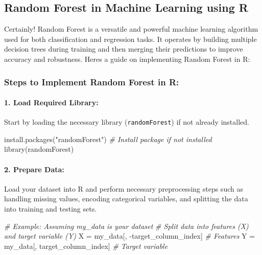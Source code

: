 \documentclass[
]{article}
\newenvironment{Shaded}{}{}
\newcommand{\CommentTok}[1]{\textcolor[rgb]{0.38,0.63,0.69}{\textit{#1}}}
\newcommand{\FunctionTok}[1]{\textcolor[rgb]{0.02,0.16,0.49}{#1}}
\newcommand{\NormalTok}[1]{#1}
\newcommand{\OtherTok}[1]{\textcolor[rgb]{0.00,0.44,0.13}{#1}}
\newcommand{\SpecialCharTok}[1]{\textcolor[rgb]{0.25,0.44,0.63}{#1}}
\newcommand{\StringTok}[1]{\textcolor[rgb]{0.25,0.44,0.63}{#1}}
\begin{document}
\hypertarget{random-forest-in-machine-learning-using-r}{%
\subsection{Random Forest in Machine Learning using
R}\label{random-forest-in-machine-learning-using-r}}

Certainly! Random Forest is a versatile and powerful machine learning
algorithm used for both classification and regression tasks. It operates
by building multiple decision trees during training and then merging
their predictions to improve accuracy and robustness.
Here\textquotesingle s a guide on implementing Random Forest in R:

\hypertarget{steps-to-implement-random-forest-in-r}{%
\subsubsection{Steps to Implement Random Forest in
R:}\label{steps-to-implement-random-forest-in-r}}

\hypertarget{1-load-required-library}{%
\paragraph{\texorpdfstring{1. \textbf{Load Required
Library:}}{1. Load Required Library:}}\label{1-load-required-library}}

Start by loading the necessary library (\texttt{randomForest}) if not
already installed.

\begin{Shaded}
\begin{Highlighting}[]
\FunctionTok{install.packages}\NormalTok{(}\StringTok{"randomForest"}\NormalTok{)  }\CommentTok{\# Install package if not installed}
\FunctionTok{library}\NormalTok{(randomForest)}
\end{Highlighting}
\end{Shaded}

\hypertarget{2-prepare-data}{%
\paragraph{\texorpdfstring{2. \textbf{Prepare
Data:}}{2. Prepare Data:}}\label{2-prepare-data}}

Load your dataset into R and perform necessary preprocessing steps such
as handling missing values, encoding categorical variables, and
splitting the data into training and testing sets.

\begin{Shaded}
\begin{Highlighting}[]
\CommentTok{\# Example: Assuming \textquotesingle{}my\_data\textquotesingle{} is your dataset}
\CommentTok{\# Split data into features (X) and target variable (Y)}
\NormalTok{X }\OtherTok{=}\NormalTok{ my\_data[, }\SpecialCharTok{{-}}\NormalTok{target\_column\_index]  }\CommentTok{\# Features}
\NormalTok{Y }\OtherTok{=}\NormalTok{ my\_data[, target\_column\_index]   }\CommentTok{\# Target variable}
\end{Highlighting}
\end{Shaded}
\end{document}
